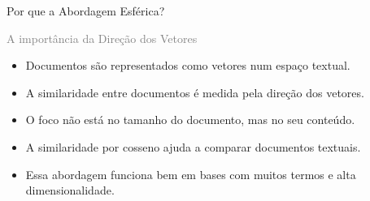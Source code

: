 \documentclass[aspectratio=43]{beamer}
\begin{document}
\begin{frame}[t]{Por que a Abordagem Esférica?}

\vspace{0.2cm}

\textcolor{gray}{\large A importância da Direção dos Vetores}

\vspace{0.3cm}

\begin{itemize}
    \item Documentos são representados como vetores num espaço textual.

    \item A similaridade entre documentos é medida pela direção dos vetores.

    \item O foco não está no tamanho do documento, mas no seu conteúdo.

    \item A similaridade por cosseno ajuda a comparar documentos textuais.

    \item Essa abordagem funciona bem em bases com muitos termos e alta dimensionalidade.
    
\end{itemize}

\end{frame}
\end{document}
